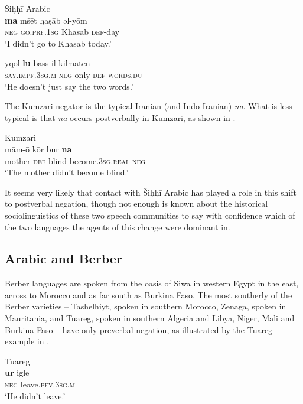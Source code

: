 \documentclass[output=paper]{langsci/langscibook}
\begin{document}
\ea
{Šiḥḥī Arabic \citep[87]{Bernabela2011}}\\
\ea\gll \textbf{mā} mšēt ḫaṣāb əl-yōm\label{shi.a}\\
     \textsc{neg} \textsc{\textup{go.}}\textsc{prf.1sg} Khasab \textsc{def-}day  \\
\glt ‘I didn’t go to Khasab today.’

\ex\gll yqōl-\textbf{lu} bass il-kilmatēn\label{shi.b}\\
     \textsc{\textup{say.}}\textsc{impf.3sg.m-}\textsc{neg} only \textsc{def-}\textsc{\textup{words.}}\textsc{du}\\
\glt ‘He doesn’t just say the two words.’
\z
\z

The Kumzari negator is the typical Iranian (and Indo-Iranian) \textit{na}. What is less typical is that \textit{na} occurs postverbally in Kumzari, as shown in .

\ea\label{kum}
{       Kumzari \citep[211]{WalAnonbyforthcoming}}\\
\gll mām-ō kōr bur \textbf{na}\\
     mother\textsc{{}-def} blind become.3\textsc{sg.real} \textsc{neg} \\
\glt ‘The mother didn’t become blind.’
\z

It seems very likely that contact with Šiḥḥī Arabic has played a role in this shift to postverbal negation, though not enough is known about the historical sociolinguistics of these two speech communities to say with confidence which of the two languages the agents of this change were dominant in.



\subsection{Arabic and Berber}


Berber languages are spoken from the oasis of Siwa in western Egypt in the east, across to Morocco and as far south as Burkina Faso. The most southerly of the Berber varieties – Tashelhiyt, spoken in southern Morocco, Zenaga, spoken in Mauritania, and Tuareg, spoken in southern Algeria and Libya, Niger, Mali and Burkina Faso – have only preverbal negation, as illustrated by the Tuareg example in .


\ea\label{tua}
{       Tuareg \citep[10]{Chaker1996}}\\
\gll \textbf{ur} igle\\
     \textsc{neg} leave\textsc{.pfv.3sg.m}\\
\glt ‘He didn’t leave.’
\z
\end{document}

